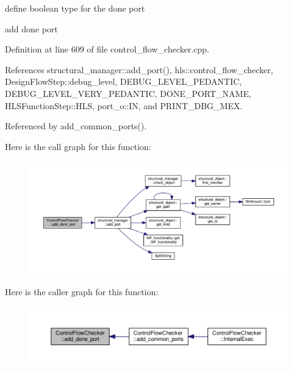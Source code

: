 define boolean type for the done port

add done port 

Definition at line 609 of file control\+\_\+flow\+\_\+checker.\+cpp.



References structural\+\_\+manager\+::add\+\_\+port(), hls\+::control\+\_\+flow\+\_\+checker, Design\+Flow\+Step\+::debug\+\_\+level, D\+E\+B\+U\+G\+\_\+\+L\+E\+V\+E\+L\+\_\+\+P\+E\+D\+A\+N\+T\+IC, D\+E\+B\+U\+G\+\_\+\+L\+E\+V\+E\+L\+\_\+\+V\+E\+R\+Y\+\_\+\+P\+E\+D\+A\+N\+T\+IC, D\+O\+N\+E\+\_\+\+P\+O\+R\+T\+\_\+\+N\+A\+ME, H\+L\+S\+Function\+Step\+::\+H\+LS, port\+\_\+o\+::\+IN, and P\+R\+I\+N\+T\+\_\+\+D\+B\+G\+\_\+\+M\+EX.



Referenced by add\+\_\+common\+\_\+ports().

Here is the call graph for this function\+:
\nopagebreak
\begin{figure}[H]
\begin{center}
\leavevmode
\includegraphics[width=350pt]{d0/dea/classControlFlowChecker_ac4b9c980db09ade524a0e72cd6d833d1_cgraph}
\end{center}
\end{figure}
Here is the caller graph for this function\+:
\nopagebreak
\begin{figure}[H]
\begin{center}
\leavevmode
\includegraphics[width=350pt]{d0/dea/classControlFlowChecker_ac4b9c980db09ade524a0e72cd6d833d1_icgraph}
\end{center}
\end{figure}
\mbox{\label{classControlFlowChecker_a99cb7891e87b906171c4330e53a96da7}} 
